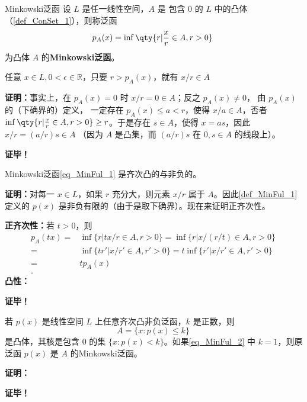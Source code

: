

\begin{definition}{Minkowski泛函}\label{def_MinFul_1}
设 $L$ 是任一线性空间，$A$ 是 包含 0 的 $L$ 中的凸体（\autoref{def_ConSet_1}），则称泛函
\begin{equation}\label{eq_MinFul_1}
p_A(x)=\inf\qty{r|\frac{x}{r}\in A,r>0}~
\end{equation}
为凸体 $A$ 的\textbf{Minkowski泛函}。

\end{definition}

\begin{lemma}{}
任意 $x\in L,0<\epsilon\in\mathbb R$，只要 $r>p_A(x)$，就有 $x/r\in A$
\end{lemma}
\textbf{证明：}事实上，在 $p_A(x)=0$ 时 $x/r=0\in A$；反之 $p_A(x)\neq0$， 由 $p_A(x)$ 的（下确界的）定义， 一定存在 $p_A(x)\leq a<r$，使得 $x/a\in A$，否者$\inf\qty{r|\frac{x}{r}\in A,r>0}\geq r$。于是存在 $s\in A$，使得 $x=as$，因此 $x/r=(a/r)s\in A$ （因为 $A$ 是凸集，而 $(a/r)s$ 在 $0,s\in A$ 的线段上）。

\textbf{证毕！}

\begin{theorem}{}
Minkowski泛函\autoref{eq_MinFul_1} 是齐次凸的与非负的。
\end{theorem}

\textbf{证明：}对每一 $x\in L$，如果 $r$ 充分大，则元素 $x/r$ 属于 $A$。因此\autoref{def_MinFul_1} 定义的 $p(x)$ 是非负有限的（由于是取下确界）。现在来证明正齐次性。

\textbf{正齐次性：}若 $t>0$，则
\begin{equation}
\begin{aligned}
p_A(tx)=&\inf \{r|tx/r\in A,r>0\}=\inf \{r|x/(r/t)\in A,r>0\}\\
=&\inf \{tr'|x/r'\in A,r'>0\}=t\inf \{r'|x/r'\in A,r'>0\}\\
=&tp_A(x)\\.
\end{aligned}~
\end{equation}
\textbf{凸性：}








\textbf{证毕！}

\begin{theorem}{}
若 $p(x)$ 是线性空间 $L$ 上任意齐次凸非负泛函，$k$ 是正数，则
\begin{equation}\label{eq_MinFul_2}
A=\{x:p(x)\leq k\}~
\end{equation}
是凸体，其核是包含 $0$ 的集 $\{x:p(x)<k\}$。如果\autoref{eq_MinFul_2} 中 $k=1$，则原泛函 $p(x)$ 是 $A$ 的Minkowski泛函。
\end{theorem}

\textbf{证明：}




\textbf{证毕！}
